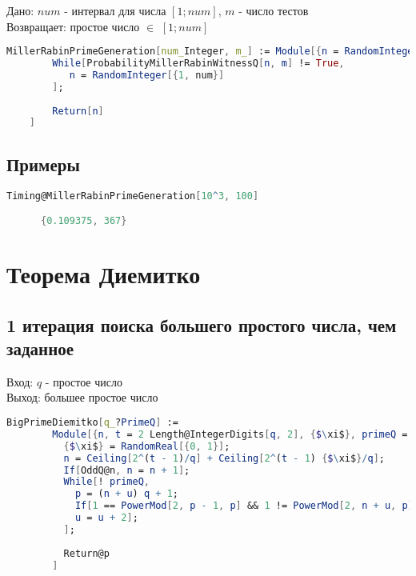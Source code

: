     Дано: {$num$} - интервал для числа {$[1;num]$}, {$m$} - число тестов \\
    Возвращает: простое число {$\in$} {$[1;num]$}

    \begin{lstlisting}[language=Mathematica,caption={
      Генерация с использованием теста Миллера-Рабина  
    }]
    MillerRabinPrimeGeneration[num_Integer, m_] := Module[{n = RandomInteger[{1, num}]},
        While[ProbabilityMillerRabinWitnessQ[n, m] != True, 
           n = RandomInteger[{1, num}]
        ];
        
        Return[n]
    ]
    \end{lstlisting}

    \subsection{Примеры}

      \begin{lstlisting}[language=Mathematica,caption={Пример 1}]
      Timing@MillerRabinPrimeGeneration[10^3, 100]

      {0.109375, 367}
      \end{lstlisting}

  \section{Теорема Диемитко}

    \subsection{1 итерация поиска большего простого числа, чем заданное}

      Вход: {$q$} - простое число \\
      Выход: большее простое число

      \begin{lstlisting}[language=Mathematica,caption={
       Теорема Диемитко (1 итерация)
      }]
    	BigPrimeDiemitko[q_?PrimeQ] := 
    	Module[{n, t = 2 Length@IntegerDigits[q, 2], {$\xi$}, primeQ = False, u = 0, p},
    	  {$\xi$} = RandomReal[{0, 1}];
    	  n = Ceiling[2^(t - 1)/q] + Ceiling[2^(t - 1) {$\xi$}/q];
    	  If[OddQ@n, n = n + 1];
    	  While[! primeQ,
    	    p = (n + u) q + 1;
    	    If[1 == PowerMod[2, p - 1, p] && 1 != PowerMod[2, n + u, p], primeQ = True,
    	    u = u + 2];
    	  ];
    	
    	  Return@p
    	]
      \end{lstlisting}

